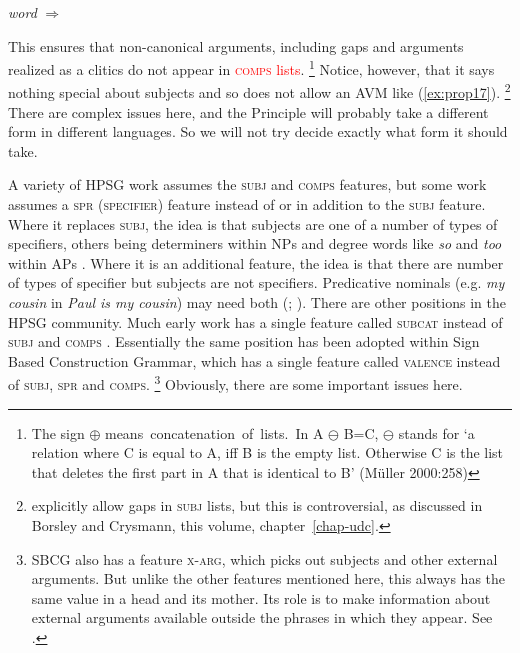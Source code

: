 \documentclass[output=paper
	        ,collection
	        ,collectionchapter
 	        ,biblatex
                ,babelshorthands
                ,newtxmath
                ,draftmode
                ,colorlinks, citecolor=brown
]{langscibook}
\begin{document}
\ea\label{ex:prop20}
\emph{word} $\Rightarrow$
\z

This ensures that non-canonical arguments, including gaps and arguments realized as a clitics do not appear in \textcolor{red}{\textsc{comps} lists}.%
%
\footnote{The sign $\oplus$ means\ concatenation\ of\ lists.\ In A $\ominus$ B=C, $\ominus$ stands for ‘a relation where C is equal to A, iff B is the empty list. Otherwise C is the list that deletes the first part in A that is identical to B’ (Müller 2000:258)}
%
Notice, however, that it says nothing special about subjects and so does not allow an AVM like (\ref{ex:prop17}).%
%
\footnote{\citet[177--183]{GSag2000a-u} explicitly allow gaps in \textsc{subj} lists, but this is controversial, as discussed in Borsley and Crysmann, this volume, chapter~\ref{chap-udc}.}
%
There are complex issues here, and the Principle will probably take a different form in different languages. So we will not try decide exactly what form it should take.

A variety of HPSG work assumes the \textsc{subj} and \textsc{comps} features, but some work assumes a \textsc{spr (specifier)} feature instead of or in addition to the \textsc{subj} feature. Where it replaces \textsc{subj}, the idea is that subjects are one of a number of types of specifiers, others being determiners within NPs and degree words like \emph{so} and \emph{too} within APs \citep{SWB2003a}. Where it is an additional feature, the idea is that there are number of types of specifier but subjects are not specifiers. Predicative nominals (e.g. \emph{my cousin} in \emph{Paul is my cousin}) may need both (\citealp[9.4.1]{ps2}; \citealp[409]{GSag2000a-u}\citealp{AG2003a-b}). There are other positions in the HPSG community. Much early work has a single feature called \textsc{subcat} instead of \textsc{subj} and \textsc{comps} \citep{ps}. Essentially the same position has been adopted within Sign Based Construction Grammar, which has a single feature called \textsc{valence} instead of \textsc{subj, spr} and \textsc{comps}.%
%
\footnote{SBCG also has a feature \textsc{x-arg}, which picks out subjects and other external arguments. But unlike the other features mentioned here, this always has the same value in a head and its mother. Its role is to make information about external arguments available outside the phrases in which they appear.  See \citet[84, 149--151]{Sag2007a,Sag2012a}.}
%
Obviously, there are some important issues here.
\end{document}

